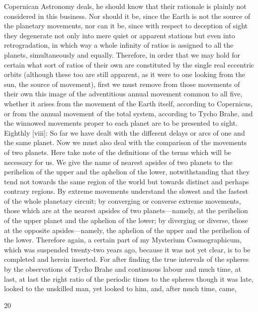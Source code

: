 \documentclass{article}
\begin{document}
Copernican Astronomy deals, he should know that their rationale is
plainly not considered in this business. Nor should it be, since the Earth
is not the source of the planetary movements, nor can it be, since with
respect to deception of sight they degenerate not only into mere quiet or
apparent stations but even into retrogradation, in which way a whole
infinity of ratios is assigned to all the planets, simultaneously and
equally. Therefore, in order that we may hold for certain what sort of
ratios of their own are constituted by the single real eccentric orbits
(although these too are still apparent, as it were to one looking from the
sun, the source of movement), first we must remove from those
movements of their own this image of the adventitious annual movement
common to all five, whether it arises from the movement of the Earth
itself, according to Copernicus, or from the annual movement of the total
system, according to Tycho Brahe, and the winnowed movements proper
to each planet are to be presented to sight.
Eighthly [viii]: So far we have dealt with the different delays or arcs of
one and the same planet. Now we must also deal with the comparison of
the movements of two planets. Here take note of the definitions of the
terms which will be necessary for us. We give the name of nearest
apsides of two planets to the perihelion of the upper and the aphelion of
the lower, notwithstanding that they tend not towards the same region of
the world but towards distinct and perhaps contrary regions. By extreme
movements understand the slowest and the fastest of the whole
planetary circuit; by converging or converse extreme movements, those
which are at the nearest apsides of two planets—namely, at the
perihelion of the upper planet and the aphelion of the lower;
by diverging or diverse, those at the opposite apsides—namely, the
aphelion of the upper and the perihelion of the lower. Therefore again, a
certain part of my Mysterium Cosmographicum, which was suspended
twenty-two years ago, because it was not yet clear, is to be completed and
herein inserted. For after finding the true intervals of the spheres by the
observations of Tycho Brahe and continuous labour and much time, at
last, at last the right ratio of the periodic times to the spheres
though it was late, looked to the unskilled man,
yet looked to him, and, after much time, came,


20
\end{document}
